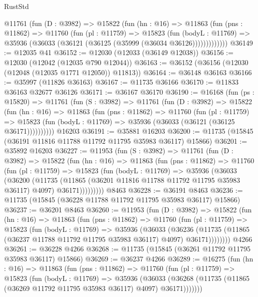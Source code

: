 \begin{lexlean}{RustStd}
\begin{coremodule}
        @11761
          (fun (D : @3982) =>
          @15822
            (fun (hn : @16) =>
            @11863
              (fun (pns : @11862) =>
              @11760
                (fun (pl : @11759) =>
                @15823
                  (fun (bodyL : @11769) =>
                  @35936 (@36033 (@36121 (@36125 (@35999 (@36034 @36126)))))))))))))
@36149 := @12035 @41
@36152 := @12030 (@12033 (@36149 @12038))
@36156 := @12030 (@12042 (@12035 @790 @12044))
@36163 := @36152 (@36156 (@12030 (@12048 (@12035 @1771 @12050)) @11813))
@36164 := @36148 @36163
@36166 := @35997 (@11826 @36163)
@36167 := @11735 @36166
@36170 := @11833 @36163 @32677 @36126
@36171 := @36167 @36170
@36190 := @16168
    (fun (ps : @15820) =>
    @11761
      (fun (S : @3982) =>
      @11761
        (fun (D : @3982) =>
        @15822
          (fun (hn : @16) =>
          @11863
            (fun (pns : @11862) =>
            @11760
              (fun (pl : @11759) =>
              @15823 (fun (bodyL : @11769) => @35936 (@36033 (@36121 (@36125 @36171))))))))))
    @16203
@36191 := @35881 @16203
@36200 := @11735 (@15845 (@36191 @11816 @11788 @11792 @11795 @35983 @36117) @15866)
@36201 := @35892 @16203
@36227 := @11953
    (fun (S : @3982) =>
    @11761
      (fun (D : @3982) =>
      @15822
        (fun (hn : @16) =>
        @11863
          (fun (pns : @11862) =>
          @11760
            (fun (pl : @11759) =>
            @15823
              (fun (bodyL : @11769) =>
              @35936
                (@36033
                  (@36200
                    (@11735
                      (@11865 (@36201 @11816 @11788 @11792 @11795 @35983 @36117) @4097)
                      @36171)))))))))
    @8463
@36228 := @36191 @8463
@36236 := @11735 (@15845 (@36228 @11788 @11792 @11795 @35983 @36117) @15866)
@36237 := @36201 @8463
@36260 := @11953
    (fun (D : @3982) =>
    @15822
      (fun (hn : @16) =>
      @11863
        (fun (pns : @11862) =>
        @11760
          (fun (pl : @11759) =>
          @15823
            (fun (bodyL : @11769) =>
            @35936
              (@36033
                (@36236
                  (@11735 (@11865 (@36237 @11788 @11792 @11795 @35983 @36117) @4097) @36171))))))))
    @4266
@36261 := @36228 @4266
@36268 := @11735 (@15845 (@36261 @11792 @11795 @35983 @36117) @15866)
@36269 := @36237 @4266
@36289 := @16275
    (fun (hn : @16) =>
    @11863
      (fun (pns : @11862) =>
      @11760
        (fun (pl : @11759) =>
        @15823
          (fun (bodyL : @11769) =>
          @35936
            (@36033
              (@36268 (@11735 (@11865 (@36269 @11792 @11795 @35983 @36117) @4097) @36171)))))))

\end{coremodule}
\end{lexlean}
